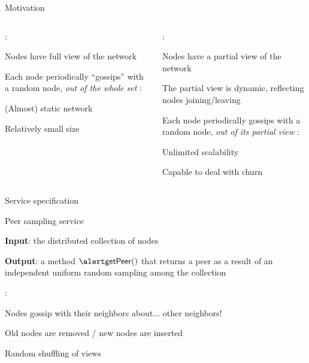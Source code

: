 \begin{frame}{Motivation}

\begin{columns}
\begin{column}{0.5\textwidth}
	
:\\
\BI
\item Nodes have \alert{full view} of the network
\item Each node periodically “gossips” with a random node, \textit{out of the whole set}
\EI
\bigskip
{}:\\
\BI
\item (Almost) static network
\item Relatively small size 
\EI
\end{column}
\pause
\begin{column}{0.5\textwidth}
:\\
\BI
\item Nodes have a \alert{partial view} of the network
\item The partial view is \alert{dynamic}, reflecting nodes joining/leaving
\item Each node periodically gossips with a random node, \textit{out of its partial view}
\EI
\bigskip
{}:\\
\BI
\item Unlimited scalability
\item Capable to deal with churn
\EI
\end{column}
\end{columns}

\end{frame}
	

\begin{frame}{Service specification}
	
\begin{block}{Peer sampling service}
\BI
\item \textbf{Input}: the distributed collection of nodes
\item \textbf{Output}: a method $\getPeer()$ that returns a peer as a
result of an independent uniform random sampling among the collection
\EI
\end{block}	
	
\bigskip
{}:\\
\BI
\item Nodes gossip with their neighbors about... other neighbors!
\item Old nodes are removed / new nodes are inserted
\item Random \alert{shuffling} of views
\EI
	
\end{frame}

